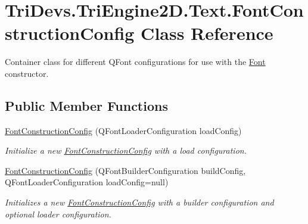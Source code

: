 \hypertarget{class_tri_devs_1_1_tri_engine2_d_1_1_text_1_1_font_construction_config}{\section{Tri\-Devs.\-Tri\-Engine2\-D.\-Text.\-Font\-Construction\-Config Class Reference}
\label{class_tri_devs_1_1_tri_engine2_d_1_1_text_1_1_font_construction_config}
}


Container class for different Q\-Font configurations for use with the \hyperlink{class_tri_devs_1_1_tri_engine2_d_1_1_text_1_1_font}{Font} constructor.  


\subsection*{Public Member Functions}
\begin{DoxyCompactItemize}
\item 
\hyperlink{class_tri_devs_1_1_tri_engine2_d_1_1_text_1_1_font_construction_config_aac2b078462c291a07ec988f23ccb677f}{Font\-Construction\-Config} (Q\-Font\-Loader\-Configuration load\-Config)
\begin{DoxyCompactList}\small\item\em Initialize a new \hyperlink{class_tri_devs_1_1_tri_engine2_d_1_1_text_1_1_font_construction_config}{Font\-Construction\-Config} with a load configuration. \end{DoxyCompactList}\item 
\hyperlink{class_tri_devs_1_1_tri_engine2_d_1_1_text_1_1_font_construction_config_a3d3158ba1bfa8a62e9829e4ce4b44dc7}{Font\-Construction\-Config} (Q\-Font\-Builder\-Configuration build\-Config, Q\-Font\-Loader\-Configuration load\-Config=null)
\begin{DoxyCompactList}\small\item\em Initializes a new \hyperlink{class_tri_devs_1_1_tri_engine2_d_1_1_text_1_1_font_construction_config}{Font\-Construction\-Config} with a builder configuration and optional loader configuration. \end{DoxyCompactList}\end{DoxyCompactItemize}

